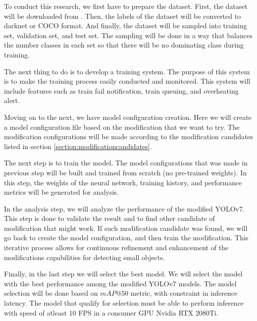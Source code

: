 
To conduct this research, we first have to prepare the dataset.
First, the dataset will be downloaded from \textcite{aot_dataset}.
Then, the labels of the dataset will be converted to darknet or COCO format.
And finally, the dataset will be sampled into training set, validation set, and test set.
The sampling will be done in a way that balances the number classes in each set so
that there will be no dominating class during training.
  
The next thing to do is to develop a training system.
The purpose of this system is to make the training process easily conducted and monitored.
This system will include features such as train fail notification, train queuing, and 
overheating alert.

Moving on to the next, we have model configuration creation. 
Here we will create a model configuration file based on the 
modification that we want to try. 
The modification configurations will be made according to the modification
candidates listed in section \ref{section:modificationcandidates}.

The next step is to train the model.
The model configurations that was made in previous step will be built and trained from scratch (no pre-trained weights).
In this step, the weights of the neural network, training history, and performance metrics will be generated for analysis.

In the analysis step, we will analyze the performance of the modified YOLOv7.
This step is done to validate the result and to find other candidate of modification that might work.
If such modification candidate was found, we will go back to create the model configuration, 
and then train the modification.
This iterative process allows for continuous refinement and enhancement of the 
modifications capabilities for detecting small objects.%

Finally, in the last step we will select the best model.
We will select the model with the best performance among the modified YOLOv7 models.
The model selection will be done based on $mAP@50$ metric, with constraint in inference latency.
The model that qualify for selection must be able to perform inference with speed of atleast 10 FPS in a consumer GPU Nvidia RTX 2080Ti.


